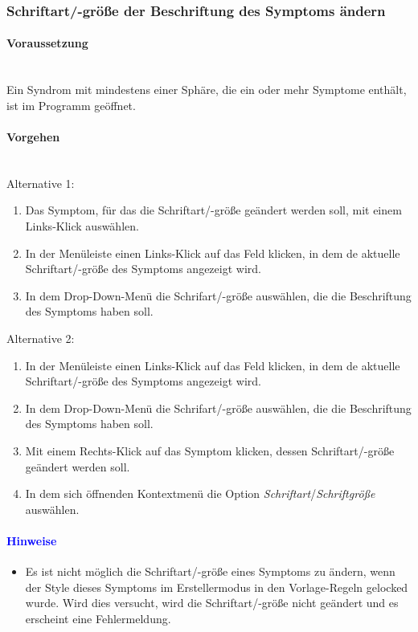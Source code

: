 \documentclass[enabledeprecatedfontcommands,fontsize=11pt,paper=a4,twoside]{scrartcl}
\newcommand*{\hint}{\paragraph{\textcolor{blue}{Hinweise}}}
\newcommand*{\condition}{\paragraph{Voraussetzung}$\;$ \vspace{0.2cm}\\}
\newcommand*{\actions}{\paragraph{Vorgehen} $\;$\vspace{0.2cm}\\}
\begin{document}
		\subsubsection{Schriftart/-größe der Beschriftung des Symptoms ändern}
				\condition 	
		Ein Syndrom mit mindestens einer Sphäre, die ein oder mehr Symptome enthält, ist im Programm geöffnet. 
		\actions  
		Alternative 1:
		\begin{enumerate}
			\item Das Symptom, für das die Schriftart/-größe geändert werden soll, mit einem Links-Klick auswählen.
			\item In der Menüleiste einen Links-Klick auf das Feld klicken, in dem de aktuelle Schriftart/-größe des Symptoms angezeigt wird.
			\item In dem Drop-Down-Menü die Schrifart/-größe auswählen, die die Beschriftung des Symptoms haben soll.
		\end{enumerate}
		Alternative 2:
			\begin{enumerate}
			\item In der Menüleiste einen Links-Klick auf das Feld klicken, in dem de aktuelle Schriftart/-größe des Symptoms angezeigt wird.
			\item In dem Drop-Down-Menü die Schrifart/-größe auswählen, die die Beschriftung des Symptoms haben soll.
			\item Mit einem Rechts-Klick auf das Symptom klicken, dessen Schriftart/-größe geändert werden soll.
			\item In dem sich öffnenden Kontextmenü die Option \textit{Schriftart}/\textit{Schriftgröße} auswählen.
		\end{enumerate}
		\hint
		\begin{itemize}
			\item Es ist nicht möglich die Schriftart/-größe eines Symptoms zu ändern, wenn der Style dieses Symptoms im Erstellermodus in den Vorlage-Regeln gelocked wurde. Wird dies versucht, wird die Schriftart/-größe nicht geändert und es erscheint eine Fehlermeldung.
			\end{itemize}
			
							\newpage	
\end{document}
